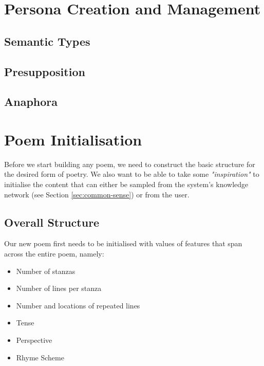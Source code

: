 \section{Persona Creation and Management}
\label{sec:persona}

\subsection{Semantic Types}

\subsection{Presupposition}

\subsection{Anaphora}


\section{Poem Initialisation}

Before we start building any poem, we need to construct the basic structure for the desired form of poetry. We also want to be able to take some \textit{"inspiration"} to initialise the content that can either be sampled from the system's knowledge network (see Section \ref{sec:common-sense}) or from the user.

\subsection{Overall Structure}
Our new poem first needs to be initialised with values of features that span across the entire poem, namely:
\begin{itemize}
\item{Number of stanzas}
\item{Number of lines per stanza}
\item{Number and locations of repeated lines}
\item{Tense}
\item{Perspective}
\item{Rhyme Scheme}
\end{itemize}

